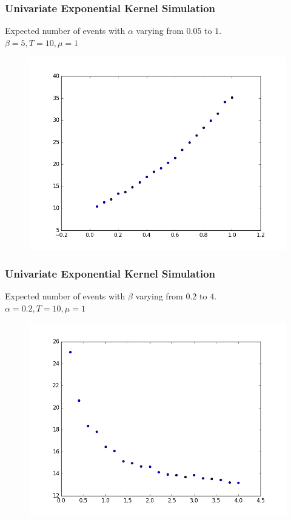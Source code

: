 \documentclass{beamer}
\begin{document}
\begin{frame}
\frametitle{Univariate Exponential Kernel Simulation}
Expected number of events with $\alpha$ varying from $0.05$ to $1$.\\
$\beta = 5, T = 10, \mu = 1$
\begin{figure}[h]
      \centering
	\includegraphics[scale=0.45]{image/AlphaSimulation.png}
\end{figure}
\end{frame}

\begin{frame}
\frametitle{Univariate Exponential Kernel Simulation}
Expected number of events with $\beta$ varying from $0.2$ to $4$.\\
$\alpha = 0.2, T = 10, \mu = 1$
\begin{figure}[h]
      \centering
	\includegraphics[scale=0.45]{image/BetaSimulation.png}
\end{figure}
\end{frame}
\end{document}
